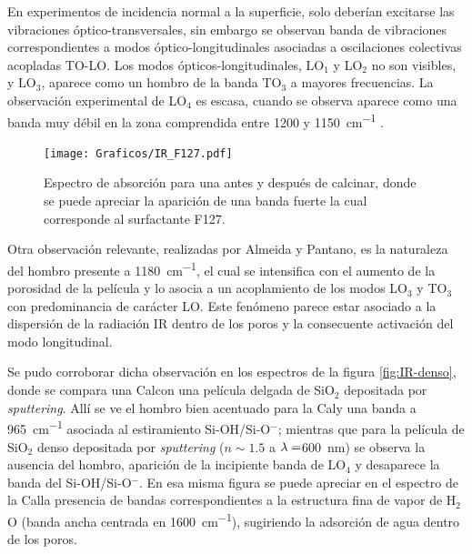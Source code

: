 		 En experimentos de incidencia normal a la superficie, solo deberían excitarse las vibraciones óptico-transversales, sin embargo se observan banda de vibraciones correspondientes a modos óptico-longitudinales asociadas a oscilaciones colectivas acopladas TO-LO\cite{Pai1986,Grosse1986,Innocenzi2003}. Los modos ópticos-longitudinales, LO$_1$ y LO$_2$ no son visibles, y LO$_3$, aparece como un hombro de la banda TO$_3$ a mayores frecuencias. La observación experimental de LO$_4$ es escasa, cuando se observa aparece como una banda muy débil en la zona comprendida entre 1200 y \SI{1150}{\cm^{-1}} \cite{Pai1986,Grosse1986}.
		 

				\begin{figure}[b!]
						\begin{center}
						\texttt{[image: Graficos/IR\_F127.pdf]}
						\caption[FTIR para una \pdmF.]{Espectro de absorción para una \pdmF\space antes y después de calcinar, donde se puede apreciar la aparición de una banda fuerte la cual corresponde al surfactante F127.}
						\label{fig:IR_F127_calciando}
						\end{center}
						\end{figure}

		 Otra observación relevante, realizadas por Almeida y Pantano\cite{Almeida1990}, es la naturaleza del hombro presente a \SI{1180}{\cm^{-1}}, el cual se intensifica con el aumento de la porosidad de la película y lo asocia a un acoplamiento de los modos LO$_3$ y TO$_3$ con predominancia de carácter LO. Este fenómeno parece estar asociado a la dispersión de la radiación IR dentro de los poros y la consecuente activación del modo longitudinal.	
			
		 Se pudo corroborar dicha observación en los espectros de la figura \ref{fig:IR-denso}, donde se compara una Cal\pdmF\space con una película delgada de SiO$_2$ depositada por \textit{sputtering}. Allí se ve el hombro bien acentuado para la Cal\pdmF\space y una banda a \SI{965}{\cm^{-1}} asociada al estiramiento Si-OH/Si-O$^-$; mientras que para la película de SiO$_2$ denso depositada por \textit{sputtering} ($n\sim 1.5$ a $\lambda\index{longitud de onda}=$\SI{600}{\nm})\cite{Vergohl1999} se observa la ausencia del hombro, aparición de la incipiente banda de LO$_4$ y desaparece la banda del Si-OH/Si-O$^-$. En esa misma figura se puede apreciar en el espectro de la Cal\pdmF\space la presencia de bandas correspondientes a la estructura fina de vapor de H$_2$O (banda ancha centrada en \SI{1600}{\cm^{-1}}), sugiriendo la adsorción de agua dentro de los poros. 

